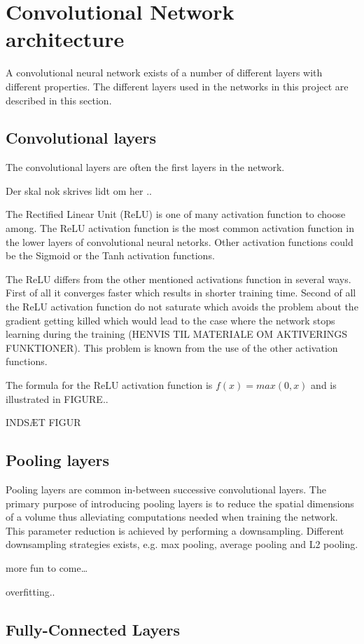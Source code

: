\graphicspath{{Chapters/Project/}}

\section{Convolutional Network architecture} %
\label{sec:convolutional_network_architecture}

A convolutional neural network exists of a number of different layers with different properties. The different layers used in the networks in this project are described in this section. 

\subsection{Convolutional layers} %
\label{sub:conv_layers}

The convolutional layers are often the first layers in the network.

Der skal nok skrives lidt om her ..

The Rectified Linear Unit (ReLU) is one of many activation function to choose
among. The ReLU activation function is the most common activation function in the lower layers of convolutional neural netorks. Other activation functions could be the Sigmoid or the Tanh activation functions.

The ReLU differs from the other mentioned activations function in several ways. First of all it converges faster which results in shorter training time. Second of all the ReLU activation function do not saturate which avoids the problem about the gradient getting killed which would lead to the case where the network stops learning during the training (HENVIS TIL MATERIALE OM AKTIVERINGS FUNKTIONER). This problem is known from the use of the other activation functions. 

The formula for the ReLU activation function is $f(x)=max(0,x)$ and is illustrated in FIGURE..

INDSÆT FIGUR


\subsection{Pooling layers} %
\label{sub:pool_layers}

Pooling layers are common in-between successive convolutional layers. The primary purpose of introducing pooling layers is to reduce the spatial dimensions of a volume thus alleviating computations needed when training the network. This parameter reduction is achieved by performing a downsampling. Different downsampling strategies exists, e.g. max pooling, average pooling and L2 pooling. 

more fun to come\ldots

overfitting..


\subsection{Fully-Connected Layers} %
\label{sub:fc_layers}


